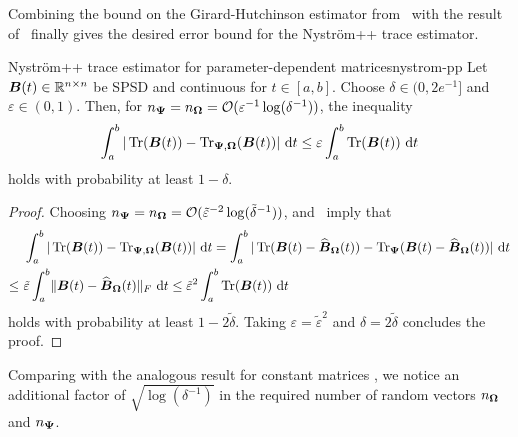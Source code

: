 Combining the bound on the Girard-Hutchinson estimator from~ with the result of~ finally gives the desired error bound for the Nyström++ trace estimator.
\begin{theorem}{Nyström++ trace estimator for parameter-dependent matrices}{nystrom-pp}
    Let $\boldsymbol{B}(t) \in \mathbb{R}^{n \times n}$ be SPSD and continuous for $t \in [a, b]$. Choose $\delta \in (0, 2e^{-1}]$ and $\varepsilon \in (0, 1)$.
    Then, for $n_{\boldsymbol{\Psi}} = n_{\boldsymbol{\Omega}} = \mathcal{O}(\varepsilon^{-1} \log(\delta^{-1}))$,
    the inequality 
    \begin{equation*}
        \int_{a}^{b} | \operatorname{Tr}(\boldsymbol{B}(t)) - \operatorname{Tr}_{\boldsymbol{\Psi}, \boldsymbol{\Omega}}(\boldsymbol{B}(t)) |~\mathrm{d}t
        \leq \varepsilon \int_{a}^{b} \operatorname{Tr}(\boldsymbol{B}(t))~\mathrm{d}t
    \end{equation*}
    holds with probability at least $1 - \delta$.
\end{theorem}
\begin{proof}
    Choosing $n_{\boldsymbol{\Psi}} = n_{\boldsymbol{\Omega}} = \mathcal{O}(\tilde{\varepsilon}^{-2} \log(\tilde{\delta}^{-1}))$,  and~ imply that
    \begin{align*}
        &\int_{a}^{b} | \operatorname{Tr}(\boldsymbol{B}(t)) - \operatorname{Tr}_{\boldsymbol{\Psi}, \boldsymbol{\Omega}}(\boldsymbol{B}(t)) |~\mathrm{d}t 
        = \int_{a}^{b} | \operatorname{Tr}(\boldsymbol{B}(t) - \widehat{\boldsymbol{B}}_{\boldsymbol{\Omega}}(t)) - \operatorname{Tr}_{\boldsymbol{\Psi}}(\boldsymbol{B}(t) - \widehat{\boldsymbol{B}}_{\boldsymbol{\Omega}}(t)) |~\mathrm{d}t  \\
        \leq\ & \tilde{\varepsilon} \int_{a}^{b} \lVert \boldsymbol{B}(t) - \widehat{\boldsymbol{B}}_{\boldsymbol{\Omega}}(t) \rVert _F ~\mathrm{d}t       \leq \tilde{\varepsilon}^2 \int_{a}^{b} \operatorname{Tr}(\boldsymbol{B}(t)) ~\mathrm{d}t 
    \end{align*}
    holds with probability at least $1 - 2\tilde{\delta}$. Taking $\varepsilon = \tilde{\varepsilon}^2$ and $\delta = 2 \tilde{\delta}$ concludes the proof.
\end{proof}

Comparing  with the analogous result for constant matrices \cite[Theorem 3.4]{persson-2022-improved-variants}, we notice an additional factor of $\sqrt{\log(\delta^{-1})}$ in the required number of random vectors $n_{\boldsymbol{\Omega}}$ and $n_{\boldsymbol{\Psi}}$.

